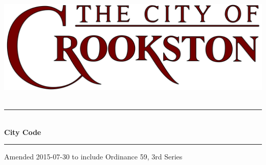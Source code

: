 \begin{titlepage}
\begin{center}

~\\[3cm]
\includegraphics[width=.75\textwidth]{./images/crookston_logo.png}~\\[2.5cm]

\hrule ~\\[0.4cm]
{\Huge\bfseries City Code}\\[0.4cm]
\hrule

\vfill

{\large Amended 2015-07-30 to include}
{\large Ordinance 59, 3rd Series}

\end{center}
\end{titlepage}
